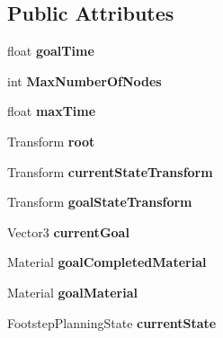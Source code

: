 \subsection*{Public Attributes}
\begin{DoxyCompactItemize}
\item 
\hypertarget{class_planner_a61bc5fb92926adb1d47117b3953dc838}{float {\bfseries goal\-Time}}\label{class_planner_a61bc5fb92926adb1d47117b3953dc838}

\item 
\hypertarget{class_planner_a11545a956f32850f9bee31866e6c1854}{int {\bfseries Max\-Number\-Of\-Nodes}}\label{class_planner_a11545a956f32850f9bee31866e6c1854}

\item 
\hypertarget{class_planner_a25d7f8ac309c61b0c1f161c36b771a6d}{float {\bfseries max\-Time}}\label{class_planner_a25d7f8ac309c61b0c1f161c36b771a6d}

\item 
\hypertarget{class_planner_a935d9d44e2bf7cfb086aef8a4a272893}{Transform {\bfseries root}}\label{class_planner_a935d9d44e2bf7cfb086aef8a4a272893}

\item 
\hypertarget{class_planner_a15508936d815ce9a6cd111428e6ed819}{Transform {\bfseries current\-State\-Transform}}\label{class_planner_a15508936d815ce9a6cd111428e6ed819}

\item 
\hypertarget{class_planner_a30a77ede048aecc823adc2775718df2a}{Transform {\bfseries goal\-State\-Transform}}\label{class_planner_a30a77ede048aecc823adc2775718df2a}

\item 
\hypertarget{class_planner_af95edfb9e8e93af5dccf7e6b18d7a9c6}{Vector3 {\bfseries current\-Goal}}\label{class_planner_af95edfb9e8e93af5dccf7e6b18d7a9c6}

\item 
\hypertarget{class_planner_a752390ecc83a78028b2ec28efe5b9d34}{Material {\bfseries goal\-Completed\-Material}}\label{class_planner_a752390ecc83a78028b2ec28efe5b9d34}

\item 
\hypertarget{class_planner_aead3ef24c43c10820e48e51ae21d3280}{Material {\bfseries goal\-Material}}\label{class_planner_aead3ef24c43c10820e48e51ae21d3280}

\item 
\hypertarget{class_planner_aee6e18d65f96ef4b7bfdc7fc035c5d43}{Footstep\-Planning\-State {\bfseries current\-State}}\label{class_planner_aee6e18d65f96ef4b7bfdc7fc035c5d43}


\end{DoxyCompactItemize}
